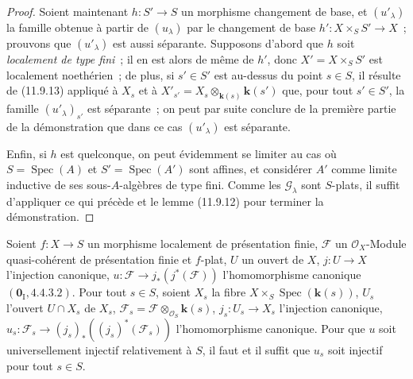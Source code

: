 \begin{proof}
Soient maintenant $h:S'\to S$ un morphisme changement de base, et
$(u'_\lambda)$ la famille obtenue à partir de $(u_\lambda)$ par le changement
de base $h':X\times_S S'\to X$~; prouvons que $(u'_\lambda)$ est aussi
séparante. Supposons d'abord que $h$ soit \emph{localement de type fini}~; il
en est alors de même de $h'$, donc $X'=X\times_S S'$ est localement
noethérien~; de plus, si $s'\in S'$ est au-dessus du point $s\in S$, il résulte
de (11.9.13) appliqué à $X_s$ et à
$X'_{s'}=X_s\otimes_{\mathbf{k}(s)}\boldsymbol{k}(s')$ que, pour tout $s'\in S'$, la famille
$(u'_\lambda)_{s'}$ est séparante~; on peut par suite conclure de la première
partie de la démonstration que dans ce cas $(u'_\lambda)$ est séparante.

Enfin, si $h$ est quelconque, on peut évidemment se limiter au cas où
$S=\operatorname{Spec}(A)$ et $S'=\operatorname{Spec}(A')$ sont affines, et
considérer $A'$ comme limite inductive de ses sous-$A$-algèbres de type fini.
Comme les $\mathcal G_\lambda$ sont $S$-plats, il suffit d'appliquer ce qui
précède et le lemme (11.9.12) pour terminer la démonstration.
\end{proof}

\begin{proposition}[11.9.17]
\label{IV.11.9.17-fr}
Soient $f:X\to S$ un morphisme localement de présentation finie, $\mathcal F$
un $\mathcal O_X$-Module quasi-cohérent de présentation finie et $f$-plat,
$U$ un ouvert de $X$, $j:U\to X$ l'injection canonique,
$u:\mathcal F\to j_*(j^*(\mathcal F))$ l'homomorphisme canonique
$(\mathbf 0_{\mathrm I},4.4.3.2)$. Pour tout $s\in S$, soient $X_s$ la fibre
$X\times_S\operatorname{Spec}(\boldsymbol{k}(s))$, $U_s$ l'ouvert $U\cap X_s$ de $X_s$,
$\mathcal F_s=\mathcal F\otimes_{\mathcal O_S}\boldsymbol{k}(s)$,
$j_s:U_s\to X_s$ l'injection canonique,
$u_s:\mathcal F_s\to(j_s)_*((j_s)^*(\mathcal F_s))$ l'homomorphisme
canonique. Pour que $u$ soit universellement injectif relativement à $S$, il
faut et il suffit que $u_s$ soit injectif pour tout $s\in S$.
\end{proposition}

